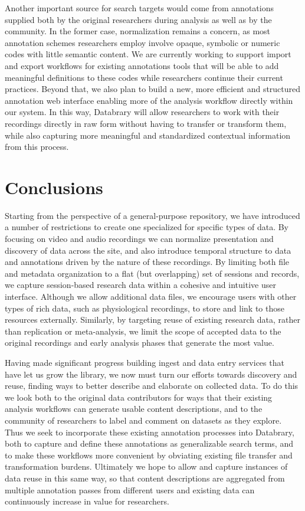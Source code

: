 \documentclass{sig-alternate}
\begin{document}
Another important source for search targets would come from annotations supplied both by the original researchers during analysis as well as by the community.
In the former case, normalization remains a concern, as most annotation schemes researchers employ involve opaque, symbolic or numeric codes with little semantic content.
We are currently working to support import and export workflows for existing annotations tools that will be able to add meaningful definitions to these codes while researchers continue their current practices.
Beyond that, we also plan to build a new, more efficient and structured annotation web interface enabling more of the analysis workflow directly within our system.
In this way, Databrary will allow researchers to work with their recordings directly in raw form without having to transfer or transform them, while also capturing more meaningful and standardized contextual information from this process.

\section{Conclusions}

Starting from the perspective of a general-purpose repository, we have introduced a number of  restrictions to create one specialized for specific types of data.
By focusing on video and audio recordings we can normalize presentation and discovery of data across the site, and also introduce temporal structure to data and annotations driven by the nature of these recordings.
By limiting both file and metadata organization to a flat (but overlapping) set of sessions and records, we capture session-based research data within a cohesive and intuitive user interface.
Although we allow additional data files, we encourage users with other types of rich data, such as physiological recordings, to store and link to those resources externally.
Similarly, by targeting reuse of existing research data, rather than replication or meta-analysis, we limit the scope of accepted data to the original recordings and early analysis phases that generate the most value.

Having made significant progress building ingest and data entry services that have let us grow the library, we now must turn our efforts towards discovery and reuse, finding ways to better describe and elaborate on collected data.
To do this we look both to the original data contributors for ways that their existing analysis workflows can generate usable content descriptions, and to the community of researchers to label and comment on datasets as they explore.
Thus we seek to incorporate these existing annotation processes into Databrary, both to capture and define these annotations as generalizable search terms, and to make these workflows more convenient by obviating existing file transfer and transformation burdens.
Ultimately we hope to allow and capture instances of data reuse in this same way, so that content descriptions are aggregated from multiple annotation passes from different users and existing data can continuously increase in value for researchers.
\end{document}
